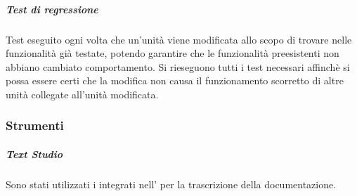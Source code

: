                     \subparagraph*{Test di regressione}
        				Test eseguito ogni volta che un'unità viene modificata allo scopo di trovare  nelle funzionalità già testate, potendo garantire che le funzionalità preesistenti non abbiano cambiato comportamento. Si rieseguono tutti i test necessari affinchè si possa essere certi che la modifica non causa il funzionamento scorretto di altre unità collegate all'unità modificata.

                \subsubsection{Strumenti}
                    \subparagraph{Text Studio}
            	        Sono stati utilizzati i  integrati nell'  per la trascrizione della documentazione.